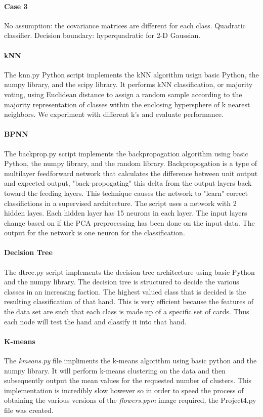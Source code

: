 \documentclass{article}
\begin{document}
\paragraph{Case 3}
No assumption: the covariance matrices are different for each class.  
Quadratic classifier.  
Decision boundary: hyperquadratic for 2-D Gaussian.

\paragraph{kNN} 
The knn.py Python script implements the kNN algorithm usign basic Python, the numpy library,
and the scipy library.  It performs kNN classification, or majority voting, using Euclidean
distance to assign a random sample according to the majority representation of classes
within the enclosing hypersphere of k nearest neighbors.  We experiment with different k's
and evaluate performance.

\paragraph{BPNN} 
The backprop.py script implements the backpropogation algorithm using basic Python, the numpy
library, and the random library.  Backpropogation is a type of multilayer feedforward network
that calculates the difference between unit output and expected output, "back-propogating"
this delta from the output layers back toward the feeding layers.  This technique causes the
network to "learn" correct classifictions in a supervised architecture. The script uses a network with 2 hidden layes. Each hidden layer has 15 neurons in each layer. The input layers change based on if the PCA preprocessing has been done on the input data. The output for the network is one neuron for the classification.

\paragraph{Decision Tree} 
The dtree.py script implements the decision tree architecture using basic Python and the numpy
library.  The decision tree is structured to decide the various classes in an increasing faction. The highest valued
class that is decided is the resulting classification of that hand. This is very efficient because the features of the
data set are such that each class is made up of a specific set of cards. Thus each node will test the hand and classify it into that hand.

\paragraph{K-means} 
The \textit{kmeans.py} file impliments the k-means algorithm using basic
python and the numpy library. It will perform k-means clustering on the 
data and then subsequently output the mean values for the requested number
of clusters. This implementation is incredibly slow however so in order to
speed the process of obtaining the various versions of the \textit{flowers.ppm}
image required, the Project4.py file was created. 
\end{document}
